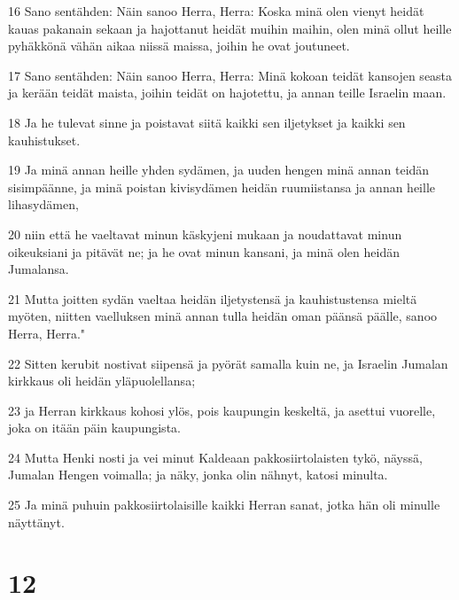 \par 16 Sano sentähden: Näin sanoo Herra, Herra: Koska minä olen vienyt heidät kauas pakanain sekaan ja hajottanut heidät muihin maihin, olen minä ollut heille pyhäkkönä vähän aikaa niissä maissa, joihin he ovat joutuneet.
\par 17 Sano sentähden: Näin sanoo Herra, Herra: Minä kokoan teidät kansojen seasta ja kerään teidät maista, joihin teidät on hajotettu, ja annan teille Israelin maan.
\par 18 Ja he tulevat sinne ja poistavat siitä kaikki sen iljetykset ja kaikki sen kauhistukset.
\par 19 Ja minä annan heille yhden sydämen, ja uuden hengen minä annan teidän sisimpäänne, ja minä poistan kivisydämen heidän ruumiistansa ja annan heille lihasydämen,
\par 20 niin että he vaeltavat minun käskyjeni mukaan ja noudattavat minun oikeuksiani ja pitävät ne; ja he ovat minun kansani, ja minä olen heidän Jumalansa.
\par 21 Mutta joitten sydän vaeltaa heidän iljetystensä ja kauhistustensa mieltä myöten, niitten vaelluksen minä annan tulla heidän oman päänsä päälle, sanoo Herra, Herra."
\par 22 Sitten kerubit nostivat siipensä ja pyörät samalla kuin ne, ja Israelin Jumalan kirkkaus oli heidän yläpuolellansa;
\par 23 ja Herran kirkkaus kohosi ylös, pois kaupungin keskeltä, ja asettui vuorelle, joka on itään päin kaupungista.
\par 24 Mutta Henki nosti ja vei minut Kaldeaan pakkosiirtolaisten tykö, näyssä, Jumalan Hengen voimalla; ja näky, jonka olin nähnyt, katosi minulta.
\par 25 Ja minä puhuin pakkosiirtolaisille kaikki Herran sanat, jotka hän oli minulle näyttänyt.

\chapter{12}

